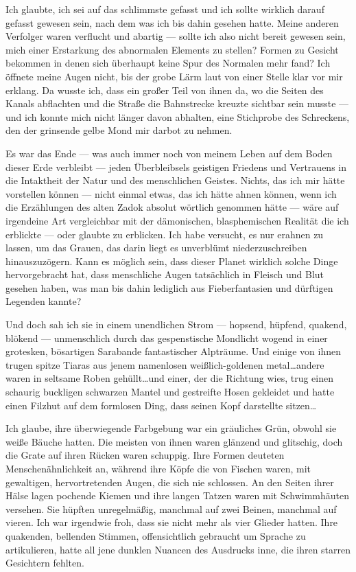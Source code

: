 Ich glaubte, ich sei auf das schlimmste gefasst und ich sollte wirklich darauf gefasst gewesen sein, nach dem was ich bis dahin gesehen hatte. Meine anderen Verfolger waren verflucht und abartig --- sollte ich also nicht bereit gewesen sein, mich einer Erstarkung des abnormalen Elements zu stellen? Formen zu Gesicht bekommen in denen sich überhaupt keine Spur des Normalen mehr fand? Ich öffnete meine Augen nicht, bis der grobe Lärm laut von einer Stelle klar vor mir erklang. Da wusste ich, dass ein großer Teil von ihnen da, wo die Seiten des Kanals abflachten und die Straße die Bahnstrecke kreuzte sichtbar sein musste --- und ich konnte mich nicht länger davon abhalten, eine Stichprobe des Schreckens, den der grinsende gelbe Mond mir darbot zu nehmen.

Es war das Ende --- was auch immer noch von meinem Leben auf dem Boden dieser Erde verbleibt --- jeden Überbleibsels geistigen Friedens und Vertrauens in die Intaktheit der Natur und des menschlichen Geistes. Nichts, das ich mir hätte vorstellen können --- nicht einmal etwas, das ich hätte ahnen können, wenn ich die Erzählungen des alten Zadok absolut wörtlich genommen hätte --- wäre auf irgendeine Art vergleichbar mit der dämonischen, blasphemischen Realität die ich erblickte --- oder glaubte zu erblicken. Ich habe versucht, es nur erahnen zu lassen, um das Grauen, das darin liegt es unverblümt niederzuschreiben hinauszuzögern. Kann es möglich sein, dass dieser Planet wirklich solche Dinge hervorgebracht hat, dass menschliche Augen tatsächlich in Fleisch und Blut gesehen haben, was man bis dahin lediglich aus Fieberfantasien und dürftigen Legenden kannte?

Und doch sah ich sie in einem unendlichen Strom --- hopsend, hüpfend, quakend, blökend --- unmenschlich durch das gespenstische Mondlicht wogend in einer grotesken, bösartigen Sarabande fantastischer Alpträume. Und einige von ihnen trugen spitze Tiaras aus jenem namenlosen weißlich-goldenen metal\dots  andere waren in seltsame Roben gehüllt\dots  und einer, der die Richtung wies, trug einen schaurig buckligen schwarzen Mantel und gestreifte Hosen gekleidet und hatte einen Filzhut auf dem formlosen Ding, dass seinen Kopf darstellte sitzen\dots

Ich glaube, ihre überwiegende Farbgebung war ein gräuliches Grün, obwohl sie weiße Bäuche hatten. Die meisten von ihnen waren glänzend und glitschig, doch die Grate auf ihren Rücken waren schuppig. Ihre Formen deuteten Menschenähnlichkeit an, während ihre Köpfe die von Fischen waren, mit gewaltigen, hervortretenden Augen, die sich nie schlossen. An den Seiten ihrer Hälse lagen pochende Kiemen und ihre langen Tatzen waren mit Schwimmhäuten versehen. Sie hüpften unregelmäßig, manchmal auf zwei Beinen, manchmal auf vieren. Ich war irgendwie froh, dass sie nicht mehr als vier Glieder hatten. Ihre quakenden, bellenden Stimmen, offensichtlich gebraucht um Sprache zu artikulieren, hatte all jene dunklen Nuancen des Ausdrucks inne, die ihren starren Gesichtern fehlten.

